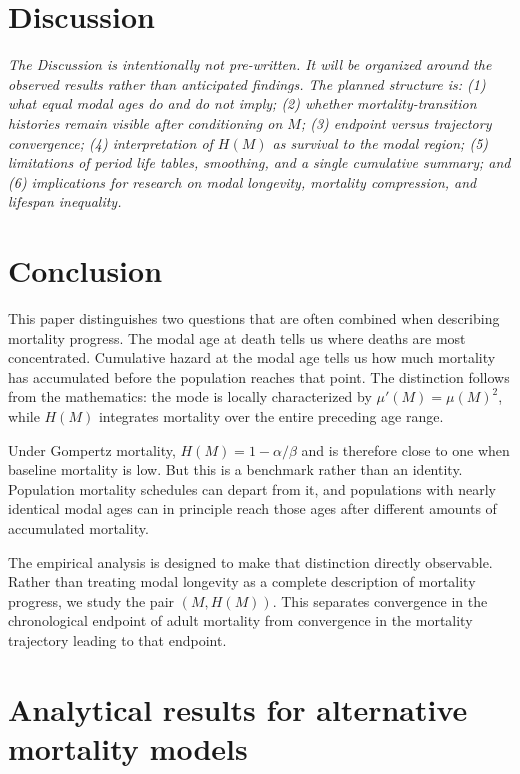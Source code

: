 \documentclass[doublespace]{interact}
\begin{document}
\section{Discussion}

\textit{The Discussion is intentionally not pre-written. It will be organized around the observed results rather than anticipated findings. The planned structure is: (1) what equal modal ages do and do not imply; (2) whether mortality-transition histories remain visible after conditioning on $M$; (3) endpoint versus trajectory convergence; (4) interpretation of $H(M)$ as survival to the modal region; (5) limitations of period life tables, smoothing, and a single cumulative summary; and (6) implications for research on modal longevity, mortality compression, and lifespan inequality.}

\section{Conclusion}

This paper distinguishes two questions that are often combined when describing mortality progress. The modal age at death tells us where deaths are most concentrated. Cumulative hazard at the modal age tells us how much mortality has accumulated before the population reaches that point. The distinction follows from the mathematics: the mode is locally characterized by $\mu'(M)=\mu(M)^2$, while $H(M)$ integrates mortality over the entire preceding age range.

Under Gompertz mortality, $H(M)=1-\alpha/\beta$ and is therefore close to one when baseline mortality is low. But this is a benchmark rather than an identity. Population mortality schedules can depart from it, and populations with nearly identical modal ages can in principle reach those ages after different amounts of accumulated mortality.

The empirical analysis is designed to make that distinction directly observable. Rather than treating modal longevity as a complete description of mortality progress, we study the pair $(M,H(M))$. This separates convergence in the chronological endpoint of adult mortality from convergence in the mortality trajectory leading to that endpoint.




\appendix
\section{Analytical results for alternative mortality models}
\end{document}

